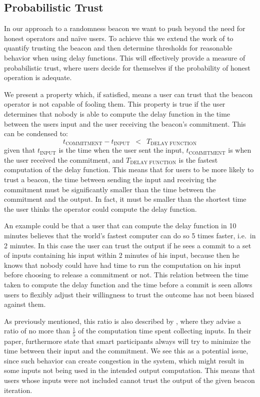 \subsection{Probabilistic Trust}%
\label{sub:probabilistic_trust}
In our approach to a randomness beacon we want to push beyond the need for honest operators and naïve users.
To achieve this we extend the work of \citet{randomzoo} to quantify trusting the beacon and then determine thresholds for reasonable behavior when using delay functions.
This will effectively provide a measure of probabilistic trust, where users decide for themselves if the probability of honest operation is adequate.

We present a property which, if satisfied, means a user can trust that the beacon operator is not capable of fooling them.
This property is true if the user determines that nobody is able to compute the delay function in the time between the users input and the user receiving the beacon's commitment.
This can be condensed to:
\begin{equation*}
    t_\text{COMMITMENT} - t_\text{INPUT}\enspace <\enspace T_\text{DELAY FUNCTION}
\end{equation*}
given that $t_\text{INPUT}$ is the time when the user sent the input, $t_\text{COMMITMENT}$ is when the user received the commitment, and $T_\text{DELAY FUNCTION}$ is the fastest computation of the delay function.
This means that for users to be more likely to trust a beacon, the time between sending the input and receiving the commitment must be significantly smaller than the time between the commitment and the output.
In fact, it must be smaller than the shortest time the user thinks the operator could compute the delay function.

An example could be that a user that can compute the delay function in 10 minutes believes that the world's fastest computer can do so 5 times faster, i.e.\ in 2 minutes. In this case the user can trust the output if he sees a commit to a set of inputs containing his input within 2 minutes of his input, because then he knows that nobody could have had time to run the computation on his input before choosing to release a commitment or not.
This relation between the time taken to compute the delay function and the time before a commit is seen allows users to flexibly adjust their willingness to trust the outcome has not been biased against them.

As previously mentioned, this ratio is also described by \citet{randomzoo}, where they advise a ratio of no more than $\frac{1}{5}$ of the computation time spent collecting inputs.
In their paper, \citeauthor{randomzoo} furthermore state that smart participants always will try to minimize the time between their input and the commitment.
We see this as a potential issue, since such behavior can create congestion in the system, which might result in some inputs not being used in the intended output computation.
This means that users whose inputs were not included cannot trust the output of the given beacon iteration.

